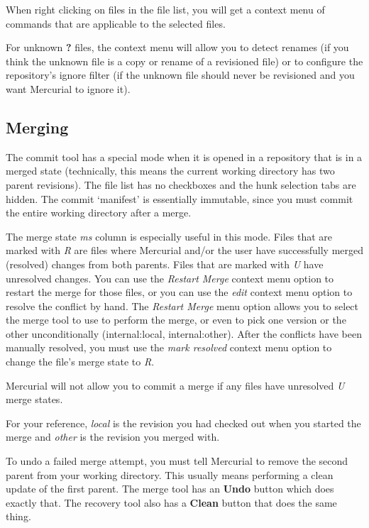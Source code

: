 \documentclass[letterpaper,10pt,english]{manual}
\begin{document}
When right clicking on files in the file list, you will get a context
menu of commands that are applicable to the selected files.

For unknown \textbf{?} files, the context menu will allow you to detect
renames (if you think the unknown file is a copy or rename of a
revisioned file) or to configure the repository's ignore filter (if the
unknown file should never be revisioned and you want Mercurial to ignore
it).


\subsection{Merging}

The commit tool has a special mode when it is opened in a repository
that is in a merged state (technically, this means the current working
directory has two parent revisions). The file list has no checkboxes and
the hunk selection tabs are hidden. The commit `manifest' is essentially
immutable, since you must commit the entire working directory after a
merge.

The merge state \emph{ms} column is especially useful in this mode.  Files
that are marked with \emph{R} are files where Mercurial and/or the user have
successfully merged (resolved) changes from both parents. Files that
are marked with \emph{U} have unresolved changes. You can use the \emph{Restart
Merge} context menu option to restart the merge for those files, or you
can use the \emph{edit} context menu option to resolve the conflict by hand.
The \emph{Restart Merge} menu option allows you to select the merge tool to
use to perform the merge, or even to pick one version or the other
unconditionally (internal:local, internal:other).  After the conflicts
have been manually resolved, you must use the \emph{mark resolved} context
menu option to change the file's merge state to \emph{R}.

Mercurial will not allow you to commit a merge if any files have
unresolved \emph{U} merge states.

For your reference, \emph{local} is the revision you had checked out when you
started the merge and \emph{other} is the revision you merged with.

To undo a failed merge attempt, you must tell Mercurial to remove the
second parent from your working directory.  This usually means
performing a clean update of the first parent.  The merge tool has an
\textbf{Undo} button which does exactly that.  The recovery tool also
has a \textbf{Clean} button that does the same thing.
\end{document}
